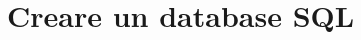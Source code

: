 \documentclass[\main/main.tex]{subfiles}
\begin{document}
\chapter{Creare un database SQL}
\end{document}
